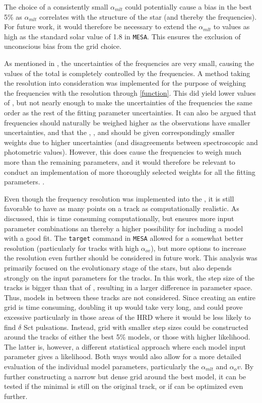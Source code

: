 The choice of a consistently small $\alpha_{mlt}$ could potentially cause a bias in the best 5\% as $\alpha_{mlt}$ correlates with the structure of the star (and thereby the frequencies). For future work, it would therefore be necessary to extend the $\alpha_{mlt}$ to values as high as the standard solar value of 1.8 in \texttt{MESA}. This ensures the exclusion of unconscious bias from the grid  choice. 
 
As mentioned in , the uncertainties of the frequencies are very small, causing the values of the total \chis is completely controlled by the frequencies. A method taking the resolution into consideration was implemented for the purpose of weighing the frequencies with the resolution through \eqref{function}.  This did yield lower values of \chis, but not nearly enough to make the uncertainties of the frequencies the same order as the rest of the fitting parameter uncertainties. It can also be argued that frequencies should naturally be weighed higher as the observations have smaller uncertainties, and that the \logg, \teff, and \lum should be given correspondingly smaller weights due to higher uncertainties (and disagreements between spectroscopic and photometric values). However, this does cause the frequencies to weigh much more than the remaining parameters, and it would therefore be relevant to conduct an implementation of more thoroughly selected weights for all the fitting parameters. . 

Even though the frequency resolution was implemented into the \chis, it is still favorable to have as many points on a track as computationally realistic. As discussed, this is time consuming computationally, but ensures  more input parameter combinations an thereby a higher possibility for including a model with a good fit. The \texttt{target} command in \texttt{MESA} allowed for a somewhat better resolution (particularly for tracks with high $\alpha_{ov}$), but more options to increase the resolution even further should be considered in future work. This analysis was primarily focused on the evolutionary stage of the stars, but also depends strongly on the input parameters for the tracks. In this work, the step size of the tracks is bigger than that of \citet{lenz2010delta}, resulting in a larger difference in parameter space. Thus, models in between these tracks are not considered. Since creating an entire grid is time consuming, doubling it up would take very long, and could prove excessive particularly in those areas of the HRD where it would be less likely to find $\delta$ Sct pulsations. Instead, grid with smaller step sizes could be constructed around the tracks of either the best 5\% models, or those with higher likelihood. The latter is, however, a different statistical approach where each model input parameter gives a likelihood. Both ways would also allow for a more detailed evaluation of the individual model parameters, particularly the $\alpha_{mlt}$ and $\alpha_ov$. By further constructing a narrow but dense grid around the best model, it can be tested if the minimal \chis is still on the original track, or if \chis can be optimized even further.  

